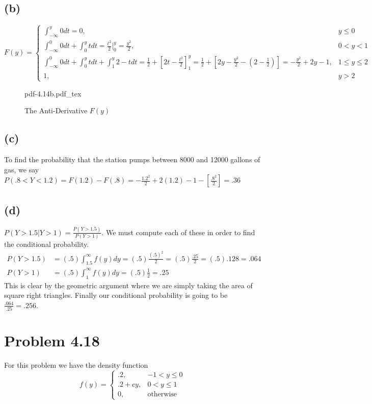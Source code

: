 \documentclass{article}
\theoremstyle{definition}
\begin{document}
    \subsection*{(b)}
        \[
            F(y) =
            \begin{cases}
                \int_{-\infty}^y 0 dt = 0, & y \leq 0\\
                \int_{-\infty}^0 0 dt + \int_0^y t dt = \frac{t^2}{2}\bigg|_0^y = \frac{y^2}{2}, & 0 < y < 1\\
                \int_{-\infty}^0 0 dt + \int_0^y t dt + \int_1^y 2 - t dt = \frac{1}{2} + \left[2t - \frac{t^2}{2}\right]_1^y = \frac{1}{2} + \left[2y - \frac{y^2}{2} - (2 - \frac{1}{2})\right] = -\frac{y^2}{2} +2y - 1, & 1 \leq y \leq 2\\
                1, & y > 2
            \end{cases}
        \]
        \begin{figure}[ht]
            \centering
            \def\svgwidth{.5\linewidth}
            {pdf-4.14b.pdf_tex}
            \caption{The Anti-Derivative $F(y)$}
            \label{fig:pdf-4.14b}
        \end{figure}
    \subsection*{(c)}
        To find the probability that the station pumps between 8000 and 12000 gallons of gas, we say
        $P(.8 < Y < 1.2) = F(1.2) - F(.8) = -\frac{1.2^2}{2} + 2(1.2) - 1 - [\frac{.8^2}{2}] = .36$
    \subsection*{(d)}
        $P(Y > 1.5 | Y > 1) = \frac{P(Y > 1.5)}{P(Y > 1)}$. We must compute each of these in order to find the conditional probability.
        \begin{align*}
            P(Y > 1.5) &= (.5)\int_{1.5}^\infty f(y)dy = (.5)\frac{(.5)^2}{2} = (.5)\frac{.25}{2} = (.5).128 = .064\\
            P(Y > 1) &= (.5)\int_1^\infty f(y)dy = (.5) \frac{1}{2} = .25
        \end{align*}
        This is clear by the geometric argument where we are simply taking the area of square right triangles. Finally our conditional probability is going to 
        be $\frac{.064}{.25} = .256$.
\section*{Problem 4.18}
    For this problem we have the density function
    \[
        f(y) =
        \begin{cases}
            .2, & -1 < y \leq 0\\
            .2 + cy, & 0 < y \leq 1\\
            0, & \text{otherwise}
        \end{cases}
    \]
\end{document}
